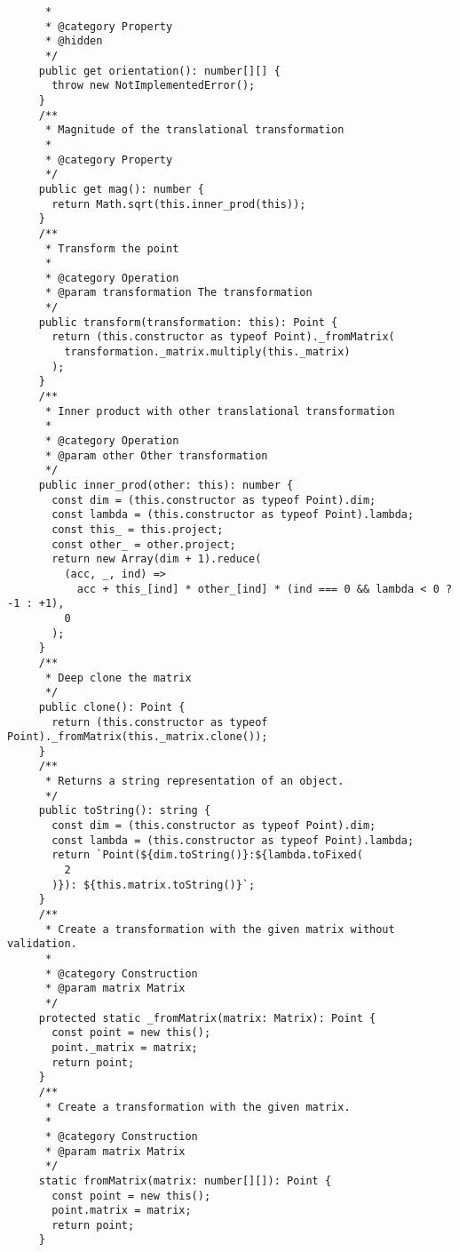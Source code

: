 \documentclass[../main.tex]{subfiles}
\begin{document}
\begin{verbatim}
      *
      * @category Property
      * @hidden
      */
     public get orientation(): number[][] {
       throw new NotImplementedError();
     }
     /**
      * Magnitude of the translational transformation
      *
      * @category Property
      */
     public get mag(): number {
       return Math.sqrt(this.inner_prod(this));
     }
     /**
      * Transform the point
      *
      * @category Operation
      * @param transformation The transformation
      */
     public transform(transformation: this): Point {
       return (this.constructor as typeof Point)._fromMatrix(
         transformation._matrix.multiply(this._matrix)
       );
     }
     /**
      * Inner product with other translational transformation
      *
      * @category Operation
      * @param other Other transformation
      */
     public inner_prod(other: this): number {
       const dim = (this.constructor as typeof Point).dim;
       const lambda = (this.constructor as typeof Point).lambda;
       const this_ = this.project;
       const other_ = other.project;
       return new Array(dim + 1).reduce(
         (acc, _, ind) =>
           acc + this_[ind] * other_[ind] * (ind === 0 && lambda < 0 ? -1 : +1),
         0
       );
     }
     /**
      * Deep clone the matrix
      */
     public clone(): Point {
       return (this.constructor as typeof Point)._fromMatrix(this._matrix.clone());
     }
     /**
      * Returns a string representation of an object.
      */
     public toString(): string {
       const dim = (this.constructor as typeof Point).dim;
       const lambda = (this.constructor as typeof Point).lambda;
       return `Point(${dim.toString()}:${lambda.toFixed(
         2
       )}): ${this.matrix.toString()}`;
     }
     /**
      * Create a transformation with the given matrix without validation.
      *
      * @category Construction
      * @param matrix Matrix
      */
     protected static _fromMatrix(matrix: Matrix): Point {
       const point = new this();
       point._matrix = matrix;
       return point;
     }
     /**
      * Create a transformation with the given matrix.
      *
      * @category Construction
      * @param matrix Matrix
      */
     static fromMatrix(matrix: number[][]): Point {
       const point = new this();
       point.matrix = matrix;
       return point;
     }
   

\end{verbatim}
\end{document}
